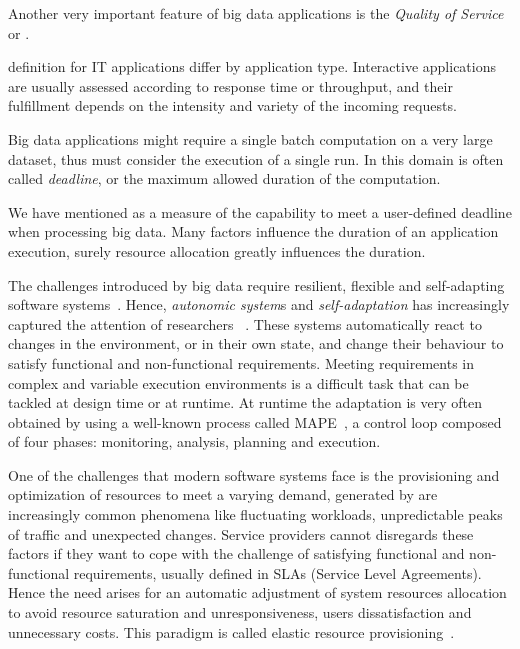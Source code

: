 Another very important feature of big data applications is the \textit{Quality of Service} or \qos.

\qos definition for IT applications differ by application type. Interactive applications are usually assessed according to response time or throughput, and their fulfillment depends on the intensity and variety of the incoming requests. 

Big data applications might require a single batch computation on a very large dataset, thus \qos must consider the execution of a single run. In this domain \qos is often called \textit{deadline}, or the maximum allowed duration of the computation. 

We have mentioned %
\qos as a measure of the capability to meet a user-defined deadline when processing big data. Many factors influence the duration of an application execution, surely resource allocation greatly influences the duration. 

The challenges introduced by big data require resilient, flexible and self-adapting software systems~\cite{DeLemos2013}. Hence, \textit{autonomic system}s and \textit{self-adaptation} has increasingly captured the attention of researchers ~\cite{Weyns:2012:CSE:2666795.2666811}. These systems automatically react to changes in the environment, or in their own state, and change their behaviour to satisfy functional and non-functional requirements. Meeting requirements in complex and variable execution environments is a difficult task that can be tackled at design time or at runtime. At runtime the adaptation is very often obtained by using a well-known process called MAPE~\cite{MAPE}, a control loop composed of four phases: monitoring, analysis, planning and execution.

One of the challenges that modern software systems face is the provisioning and optimization of resources to meet a varying demand, generated by are increasingly common phenomena like fluctuating workloads, unpredictable peaks of traffic and unexpected changes. Service providers cannot disregards these factors if they want to cope with the challenge of satisfying functional and non-functional requirements, usually defined in SLAs (Service Level Agreements). Hence the need arises for an automatic adjustment of system resources allocation to avoid resource saturation and unresponsiveness, users dissatisfaction and unnecessary costs. This paradigm is called elastic resource provisioning~\cite{Dustdar2011, Zhang2010, Sehgal2012, Herbst2013}.

